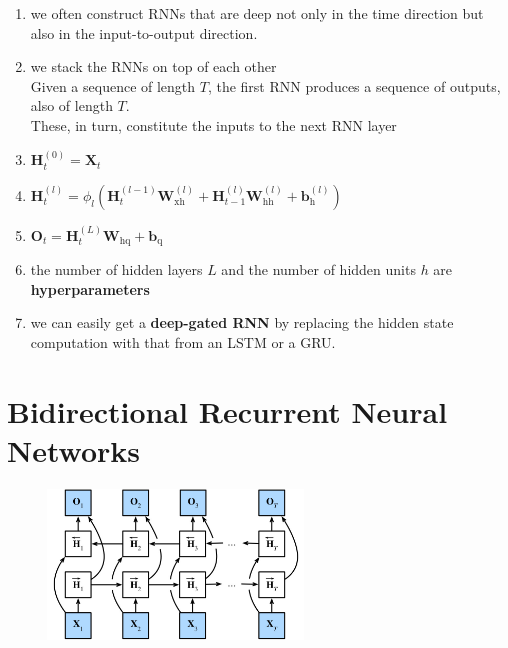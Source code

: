\begin{enumerate}[itemsep=0.15cm]
    \item we often construct RNNs that are deep not only in the time direction but also in the input-to-output direction.

    \item we stack the RNNs on top of each other\\
    Given a sequence of length $T$, the first RNN produces a sequence of outputs, also of length $T$.\\
    These, in turn, constitute the inputs to the next RNN layer

    \item $\mathbf{H}_t^{(0)} = \mathbf{X}_t$

    \item $\mathbf{H}_t^{(l)} = \phi_l(\mathbf{H}_t^{(l-1)} \mathbf{W}_{\textrm{xh}}^{(l)} + \mathbf{H}_{t-1}^{(l)} \mathbf{W}_{\textrm{hh}}^{(l)}  + \mathbf{b}_\textrm{h}^{(l)})$

    \item $\mathbf{O}_t = \mathbf{H}_t^{(L)} \mathbf{W}_{\textrm{hq}} + \mathbf{b}_\textrm{q}$

    \item the number of hidden layers $L$ and the number of hidden units $h$ are \textbf{hyperparameters}

    \item we can easily get a \textbf{deep-gated RNN} by replacing the hidden state computation with that from an LSTM or a GRU.

    
\end{enumerate}





\section{Bidirectional Recurrent Neural Networks \cite{dnn-1}} \label{Bidirectional Recurrent Neural Networks}

\begin{figure}[H]
    \centering
    \includegraphics[width=\linewidth, height=4cm, keepaspectratio]{Pictures/deep-reinforcement-learning/bidir-rnn.jpg}
\end{figure}


